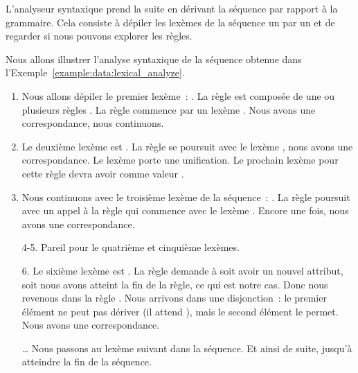 L'analyseur syntaxique prend la suite en dérivant la séquence par rapport à la
grammaire. Cela consiste à dépiler les lexèmes de la séquence un par un et de
regarder si nous pouvons explorer les règles.

\begin{example}[Analyse syntaxique de \code{<a x="y"><b /><c>foo</c></a>}]
\label{example:data:syntactic_analyze}

Nous allons illustrer l'analyse syntaxique de la séquence obtenue dans
l'Exem\-ple~\ref{example:data:lexical_analyze}.

\begin{enumerate}

\item Nous allons dépiler le premier lexème~: . La règle  est
composée de une ou plusieurs règles . La règle  commence par
un lexème . Nous avons une correspondance, nous continuons.

\item Le deuxième lexème est . La règle  se poursuit avec
le lexème , nous avons une correspondance. Le lexème 
porte une unification. Le prochain lexème  pour cette règle devra
avoir comme valeur .

\item Nous continuons avec le troisième lexème de la séquence~: . La
règle  poursuit avec un appel à la règle  qui
commence avec le lexème . Encore une fois, nous avons une
correspondance.

\item[4-5.] Pareil pour le quatrième et cinquième lexèmes.

\item[6.] Le sixième lexème est . La règle  demande à
soit avoir un nouvel attribut, soit nous avons atteint la fin de la règle, ce
qui est notre cas. Donc nous revenons dans la règle . Nous arrivons
dans une disjonction~: le premier élément ne peut pas dériver  (il
attend ), mais le second élément le permet. Nous avons une
correspondance.

\item[…] Nous passons au lexème suivant dans la séquence. Et ainsi de suite,
jusqu'à atteindre la fin de la séquence.

\end{enumerate}

\end{example}

